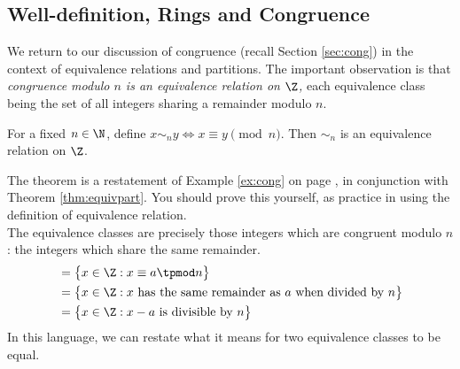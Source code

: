 \begin{enumerate}
\begin{minipage}{0.2\textwidth}
	\end{minipage}
\end{enumerate}
\newpage


\subsection{Well-definition, Rings and Congruence}\label{sec:welldefn}

We return to our discussion of congruence (recall Section \ref{sec:cong}) in the context of equivalence relations and partitions. The important observation is that \emph{congruence modulo $n$ is an equivalence relation on $\Z$,} each equivalence class being the set of all integers sharing a remainder modulo $n$.

\begin{thm}\label{thm:congequiv1}
For a fixed $n\in\N$, define $x\sim_n y\iff x\equiv y\pmod n$. Then $\sim_n$ is an equivalence relation on $\Z$.
\end{thm}

\noindent The theorem is a restatement of Example \ref{ex:cong} on page \pageref{ex:cong}, in conjunction with Theorem \ref{thm:equivpart}. You should prove this yourself, as practice in using the definition of equivalence relation.\\
The equivalence classes are precisely those integers which are congruent modulo $n$: the integers which share the same remainder.
\begin{align*}
[a]&=\big\{x\in\Z:x\equiv a\tpmod n\big\}\\
&=\big\{x\in\Z:x\text{ has the same remainder as $a$ when divided by $n$}\big\}\\
&=\big\{x\in\Z:x-a\text{ is divisible by $n$}\big\}
\end{align*}
In this language, we can restate what it means for two equivalence classes to be equal.

